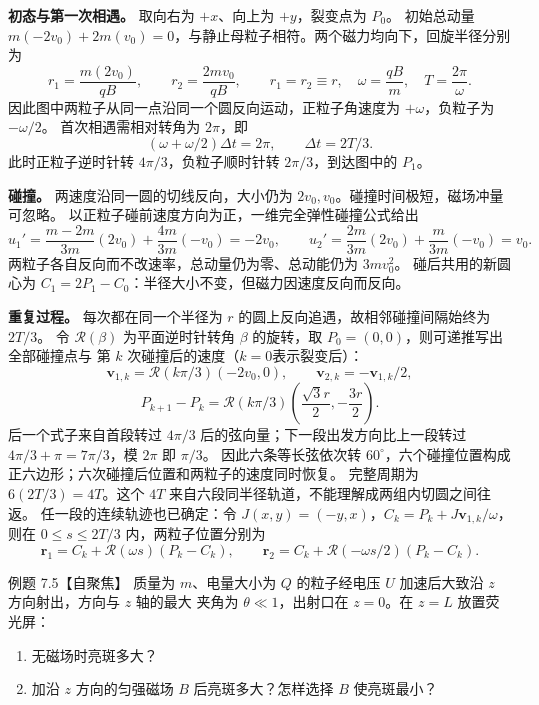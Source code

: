 \begin{xesolution}
\textbf{初态与第一次相遇。} 取向右为 $+x$、向上为 $+y$，裂变点为 $P_0$。
初始总动量 $m(-2v_0)+2m(v_0)=0$，与静止母粒子相符。两个磁力均向下，回旋半径分别为
\[
 r_1=\frac{m(2v_0)}{qB},\qquad r_2=\frac{2mv_0}{qB},\qquad
 r_1=r_2\equiv r,\quad \omega=\frac{qB}{m},\quad T=\frac{2\pi}{\omega}.
\]
因此图中两粒子从同一点沿同一个圆反向运动，正粒子角速度为 $+\omega$，负粒子为 $-\omega/2$。
首次相遇需相对转角为 $2\pi$，即
\[
 (\omega+\omega/2)\Delta t=2\pi,\qquad \boxed{\Delta t=2T/3}.
\]
此时正粒子逆时针转 $4\pi/3$，负粒子顺时针转 $2\pi/3$，到达图中的 $P_1$。

\textbf{碰撞。} 两速度沿同一圆的切线反向，大小仍为 $2v_0,v_0$。碰撞时间极短，磁场冲量可忽略。
以正粒子碰前速度方向为正，一维完全弹性碰撞公式给出
\[
 u_1'=\frac{m-2m}{3m}(2v_0)+\frac{4m}{3m}(-v_0)=-2v_0,
 \qquad
 u_2'=\frac{2m}{3m}(2v_0)+\frac{m}{3m}(-v_0)=v_0.
\]
两粒子各自反向而不改速率，总动量仍为零、总动能仍为 $3mv_0^2$。
碰后共用的新圆心为 $C_1=2P_1-C_0$：半径大小不变，但磁力因速度反向而反向。

\splitProductsDiagram

\textbf{重复过程。} 每次都在同一个半径为 $r$ 的圆上反向追遇，故相邻碰撞间隔始终为 $2T/3$。
令 $\mathcal R(\beta)$ 为平面逆时针转角 $\beta$ 的旋转，取 $P_0=(0,0)$，则可递推写出全部碰撞点与
第 $k$ 次碰撞后的速度（$k=0$表示裂变后）：
\[
 \boldsymbol v_{1,k}=\mathcal R(k\pi/3)(-2v_0,0),\qquad
 \boldsymbol v_{2,k}=-\boldsymbol v_{1,k}/2,
\]
\[
 P_{k+1}-P_k=\mathcal R(k\pi/3)
 \left(\frac{\sqrt3 r}{2},-\frac{3r}{2}\right).
\]
后一个式子来自首段转过 $4\pi/3$ 后的弦向量；下一段出发方向比上一段转过
$4\pi/3+\pi=7\pi/3$，模 $2\pi$ 即 $\pi/3$。
因此六条等长弦依次转 $60^\circ$，六个碰撞位置构成正六边形；六次碰撞后位置和两粒子的速度同时恢复。
完整周期为 $6(2T/3)=\boxed{4T}$。这个 $4T$ 来自六段同半径轨道，不能理解成两组内切圆之间往返。
任一段的连续轨迹也已确定：令 $J(x,y)=(-y,x)$，$C_k=P_k+J\boldsymbol v_{1,k}/\omega$，则在
$0\le s\le2T/3$ 内，两粒子位置分别为
\[
 \boldsymbol r_1=C_k+\mathcal R(\omega s)(P_k-C_k),\qquad
 \boldsymbol r_2=C_k+\mathcal R(-\omega s/2)(P_k-C_k).
\]

\end{xesolution}

\Needspace{0.44\textheight}
\begin{origexamplebox}{例题 7.5【自聚焦】}
质量为 $m$、电量大小为 $Q$ 的粒子经电压 $U$ 加速后大致沿 $z$ 方向射出，方向与 $z$ 轴的最大
夹角为 $\theta\ll1$，出射口在 $z=0$。在 $z=L$ 放置荧光屏：
\begin{enumerate}[label=(\arabic*),leftmargin=2.2em]
  \item 无磁场时亮斑多大？
  \item 加沿 $z$ 方向的匀强磁场 $B$ 后亮斑多大？怎样选择 $B$ 使亮斑最小？
\end{enumerate}
\end{origexamplebox}


